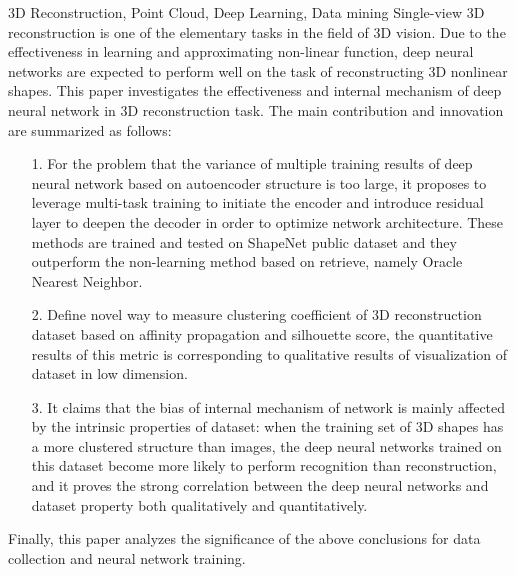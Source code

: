 \documentclass[bachelor, nocolorlinks, printoneside]{seuthesis} %
\begin{document}
\begin{englishabstract}{3D Reconstruction, Point Cloud, Deep Learning, Data mining}
    Single-view 3D reconstruction is one of the elementary tasks in the field of 3D vision. Due to the effectiveness in learning and approximating non-linear function, deep neural networks are expected to perform well on the task of reconstructing 3D nonlinear shapes. This paper investigates the effectiveness and internal mechanism of deep neural network in 3D reconstruction task. The main contribution and innovation are summarized as follows:
    \begin{enumerate}
        \item[1.] For the problem that the variance of multiple training results of deep neural network based on autoencoder structure is too large, it proposes to leverage multi-task training to initiate the encoder and introduce residual layer to deepen the decoder in order to optimize network architecture. These methods are trained and tested on ShapeNet public dataset and they outperform the non-learning method based on retrieve, namely Oracle Nearest Neighbor. 
        \item[2.] Define novel way to measure clustering coefficient of 3D reconstruction dataset based on affinity propagation and silhouette score, the quantitative results of this metric is corresponding to qualitative results of visualization of dataset in low dimension.
        \item[3.] It claims that the bias of internal mechanism of network is mainly affected by the intrinsic properties of dataset: when the training set of 3D shapes has a more clustered structure than images, the deep neural networks trained on this dataset become more likely to perform recognition than reconstruction, and it proves the strong correlation between the deep neural networks and dataset property both qualitatively and quantitatively.
    \end{enumerate}
    Finally, this paper analyzes the significance of the above conclusions for data collection and neural network training.
\end{englishabstract}

\tableofcontents

\end{document}
